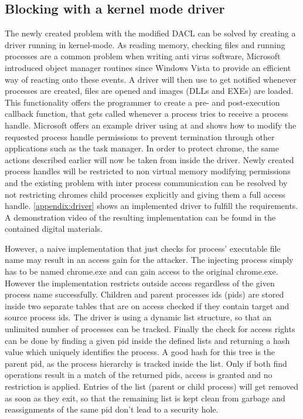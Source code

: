 \subsection{Blocking  with a kernel mode driver}
The newly created problem with the modified DACL can be solved by creating a driver running in kernel-mode. As reading memory, checking files and running processes are a common problem when writing anti virus software, Microsoft introduced object manager routines since Windows Vista to provide an efficient way of reacting onto these events. A driver will then use  to get notified whenever processes are created, files are opened and images (DLLs and EXEs) are loaded. This functionality offers the programmer to create a pre- and post-execution callback function, that gets called whenever a process tries to receive a process handle. Microsoft offers an example driver using  at \cite{github_obcallback} and shows how to modify the requested process handle permissions to prevent termination through other applications such as the task manager. In order to protect chrome, the same actions described earlier will now be taken from inside the driver. Newly created process handles will be restricted to non virtual memory modifying permissions and the existing problem with inter process communication can be resolved by not restricting chromes child processes explicitly and giving them a full access handle. \ref{appendix:driver} shows an implemented driver to fulfill the requirements. A demonstration video of the resulting implementation can be found in the contained digital materials.

However, a naive implementation that just checks for process' executable file name may result in an access gain for the attacker. The injecting process simply has to be named chrome.exe and can gain access to the original chrome.exe. However the implementation restricts outside access regardless of the given process name successfully. Children and parent processes ids (pids) are stored inside two separate tables that are on access checked if they contain target and source process ids. The driver is using a dynamic list structure, so that an unlimited number of processes can be tracked. Finally the check for access rights can be done by finding a given pid inside the defined lists and returning a hash value which uniquely identifies the process. A good hash for this tree is the parent pid, as the process hierarchy is tracked inside the list. Only if both find operations result in a match of the returned pids, access is granted and no restriction is applied. Entries of the list (parent or child process) will get removed as soon as they exit, so that the remaining list is kept clean from garbage and reassignments of the same pid don't lead to a security hole. 


